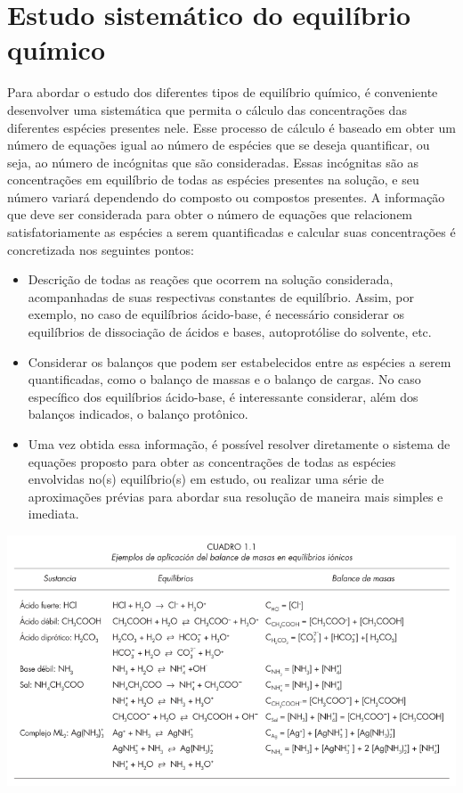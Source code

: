 \section*{Estudo sistemático do equilíbrio químico}

Para abordar o estudo dos diferentes tipos de equilíbrio químico, é conveniente desenvolver uma sistemática que permita o cálculo das concentrações das diferentes espécies presentes nele. Esse processo de cálculo é baseado em obter um número de equações igual ao número de espécies que se deseja quantificar, ou seja, ao número de incógnitas que são consideradas. Essas incógnitas são as concentrações em equilíbrio de todas as espécies presentes na solução, e seu número variará dependendo do composto ou compostos presentes. A informação que deve ser considerada para obter o número de equações que relacionem satisfatoriamente as espécies a serem quantificadas e calcular suas concentrações é concretizada nos seguintes pontos:

\begin{itemize}
    \item Descrição de todas as reações que ocorrem na solução considerada, acompanhadas de suas respectivas constantes de equilíbrio. Assim, por exemplo, no caso de equilíbrios ácido-base, é necessário considerar os equilíbrios de dissociação de ácidos e bases, autoprotólise do solvente, etc.
    \item Considerar os balanços que podem ser estabelecidos entre as espécies a serem quantificadas, como o balanço de massas e o balanço de cargas. No caso específico dos equilíbrios ácido-base, é interessante considerar, além dos balanços indicados, o balanço protônico.
    \item Uma vez obtida essa informação, é possível resolver diretamente o sistema de equações proposto para obter as concentrações de todas as espécies envolvidas no(s) equilíbrio(s) em estudo, ou realizar uma série de aproximações prévias para abordar sua resolução de maneira mais simples e imediata.
\end{itemize}

\includegraphics*[width=\linewidth]{./images/balanco_massas.png}

